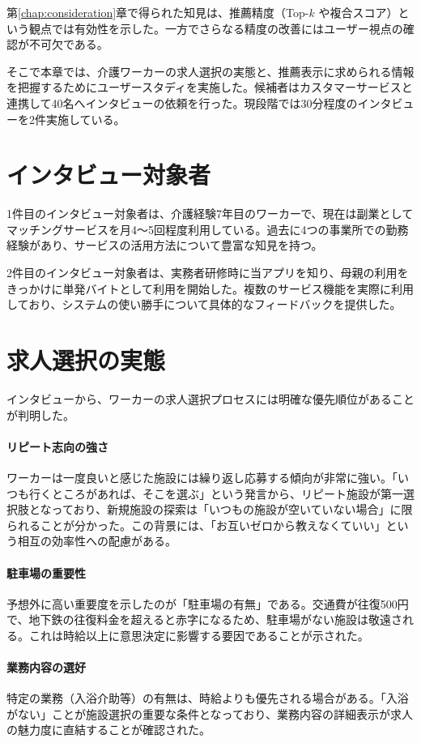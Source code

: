 第\ref{chap:consideration}章で得られた知見は、推薦精度（Top-$k$ や複合スコア）という観点では有効性を示した。一方でさらなる精度の改善にはユーザー視点の確認が不可欠である。

そこで本章では、介護ワーカーの求人選択の実態と、推薦表示に求められる情報を把握するためにユーザースタディを実施した。候補者はカスタマーサービスと連携して40名へインタビューの依頼を行った。現段階では30分程度のインタビューを2件実施している。

\section{インタビュー対象者}
1件目のインタビュー対象者は、介護経験7年目のワーカーで、現在は副業としてマッチングサービスを月4〜5回程度利用している。過去に4つの事業所での勤務経験があり、サービスの活用方法について豊富な知見を持つ。

2件目のインタビュー対象者は、実務者研修時に当アプリを知り、母親の利用をきっかけに単発バイトとして利用を開始した。複数のサービス機能を実際に利用しており、システムの使い勝手について具体的なフィードバックを提供した。

\section{求人選択の実態}
インタビューから、ワーカーの求人選択プロセスには明確な優先順位があることが判明した。

\paragraph{リピート志向の強さ}
ワーカーは一度良いと感じた施設には繰り返し応募する傾向が非常に強い。「いつも行くところがあれば、そこを選ぶ」という発言から、リピート施設が第一選択肢となっており、新規施設の探索は「いつもの施設が空いていない場合」に限られることが分かった。この背景には、「お互いゼロから教えなくていい」という相互の効率性への配慮がある。

\paragraph{駐車場の重要性}
予想外に高い重要度を示したのが「駐車場の有無」である。交通費が往復500円で、地下鉄の往復料金を超えると赤字になるため、駐車場がない施設は敬遠される。これは時給以上に意思決定に影響する要因であることが示された。

\paragraph{業務内容の選好}
特定の業務（入浴介助等）の有無は、時給よりも優先される場合がある。「入浴がない」ことが施設選択の重要な条件となっており、業務内容の詳細表示が求人の魅力度に直結することが確認された。

